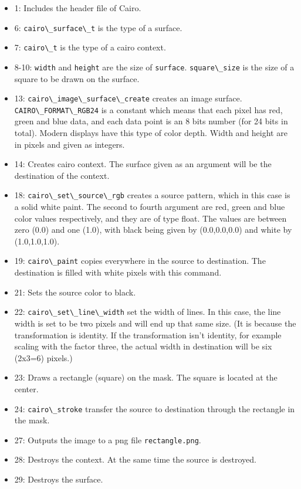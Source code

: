 \begin{itemize}
\tightlist
\item
  1: Includes the header file of Cairo.
\item
  6: \passthrough{\lstinline!cairo\_surface\_t!} is the type of a
  surface.
\item
  7: \passthrough{\lstinline!cairo\_t!} is the type of a cairo context.
\item
  8-10: \passthrough{\lstinline!width!} and
  \passthrough{\lstinline!height!} are the size of
  \passthrough{\lstinline!surface!}.
  \passthrough{\lstinline!square\_size!} is the size of a square to be
  drawn on the surface.
\item
  13: \passthrough{\lstinline!cairo\_image\_surface\_create!} creates an
  image surface. \passthrough{\lstinline!CAIRO\_FORMAT\_RGB24!} is a
  constant which means that each pixel has red, green and blue data, and
  each data point is an 8 bits number (for 24 bits in total). Modern
  displays have this type of color depth. Width and height are in pixels
  and given as integers.
\item
  14: Creates cairo context. The surface given as an argument will be
  the destination of the context.
\item
  18: \passthrough{\lstinline!cairo\_set\_source\_rgb!} creates a source
  pattern, which in this case is a solid white paint. The second to
  fourth argument are red, green and blue color values respectively, and
  they are of type float. The values are between zero (0.0) and one
  (1.0), with black being given by (0.0,0.0,0.0) and white by
  (1.0,1.0,1.0).
\item
  19: \passthrough{\lstinline!cairo\_paint!} copies everywhere in the
  source to destination. The destination is filled with white pixels
  with this command.
\item
  21: Sets the source color to black.
\item
  22: \passthrough{\lstinline!cairo\_set\_line\_width!} set the width of
  lines. In this case, the line width is set to be two pixels and will
  end up that same size. (It is because the transformation is identity.
  If the transformation isn't identity, for example scaling with the
  factor three, the actual width in destination will be six (2x3=6)
  pixels.)
\item
  23: Draws a rectangle (square) on the mask. The square is located at
  the center.
\item
  24: \passthrough{\lstinline!cairo\_stroke!} transfer the source to
  destination through the rectangle in the mask.
\item
  27: Outputs the image to a png file
  \passthrough{\lstinline!rectangle.png!}.
\item
  28: Destroys the context. At the same time the source is destroyed.
\item
  29: Destroys the surface.
\end{itemize}

